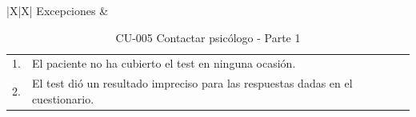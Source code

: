 \begin{table}[htpb]
\begin{tabularx}{\textwidth}{|X|X|}
Excepciones                       & \begin{tabular}{p{0.5cm} p{5cm}}1.  &  El paciente no ha cubierto el test en ninguna ocasión.\\ 2.  &  El test dió un resultado impreciso para las respuestas dadas en el cuestionario.\end{tabular}                                                                                                                                                                                                                                                                                                                                                                                                                                                                                              \\ \hline
\end{tabularx}
\caption{CU-005 Contactar psicólogo - Parte 1}                                                                                                                                                                                                                                                                                                                                                                                                                                                                                                                                                                                                                                                                                                 
\end{table}

